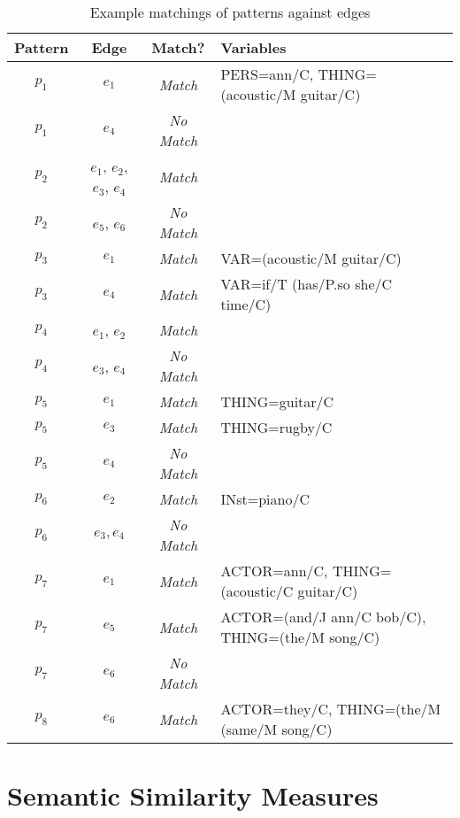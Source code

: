 \documentclass[11pt, numbers=noenddot]{scrreprt}
\begin{document}
\begin{table}[ht]
\centering
\begin{tabular}{cccl}
\toprule
\textbf{Pattern} & \textbf{Edge} & \textbf{Match?} & \textbf{Variables} \\
\midrule
\(p_1\) & \(e_1\) & \textit{Match} & \textsf{PERS=ann/C, THING=(acoustic/M guitar/C)} \\
\(p_1\) & \(e_4\) & \textit{No Match} & \\
\(p_2\) & \(e_1\), \(e_2\), \(e_3\), \(e_4\) & \textit{Match} & \\
\(p_2\) & \(e_5\), \(e_6\) & \textit{No Match} & \\
\(p_3\) & \(e_1\) & \textit{Match} & \textsf{VAR=(acoustic/M guitar/C)} \\
\(p_3\) & \(e_4\) & \textit{Match} & \textsf{VAR=if/T (has/P.so she/C time/C)} \\
\(p_4\) & \(e_1\), \(e_2\) & \textit{Match} & \\
\(p_4\) & \(e_3\), \(e_4\)  & \textit{No Match} & \\
\(p_5\) & \(e_1\)  & \textit{Match} & \textsf{THING=guitar/C} \\
\(p_5\) & \(e_3\)  & \textit{Match} & \textsf{THING=rugby/C} \\
\(p_5\) & \(e_4\)  & \textit{No Match} & \\
\(p_6\) & \(e_2\)  & \textit{Match} & \textsf{IN\gls{st}=piano/C} \\
\(p_6\) & \(e_3, e_4\)  & \textit{No Match} & \\
\(p_7\) & \(e_1\)  & \textit{Match} & \textsf{ACTOR=ann/C, THING=(acoustic/C guitar/C)}\\
\(p_7\) & \(e_5\)  & \textit{Match} & \textsf{ACTOR=(and/J ann/C bob/C), THING=(the/M song/C)}\\
\(p_7\) & \(e_6\)  & \textit{No Match} & \\
\(p_8\) & \(e_6\)  & \textit{Match} & \textsf{ACTOR=they/C, THING=(the/M (same/M song/C)}\\
\bottomrule
\end{tabular}
\caption{Example matchings of patterns against edges}
\label{tab:shpl-example-matchings}
\vspace{2\baselineskip}
\end{table}



\section{Semantic Similarity Measures}
\label{sec:semantic-similarity}
\end{document}
